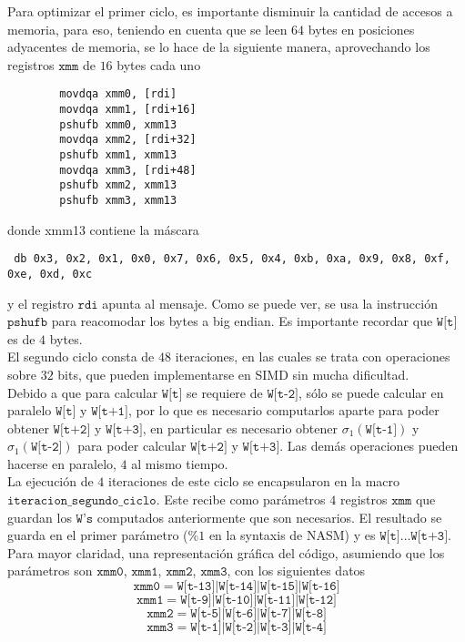Para optimizar el primer ciclo, es importante disminuir la cantidad de accesos a memoria, para eso, teniendo en cuenta que se leen $64$ bytes en posiciones adyacentes de memoria, se lo hace de la siguiente manera, aprovechando los registros $\texttt{xmm}$ de $16$ bytes cada uno
\begin{verbatim}
        movdqa xmm0, [rdi]
        movdqa xmm1, [rdi+16]
        pshufb xmm0, xmm13
        movdqa xmm2, [rdi+32]
        pshufb xmm1, xmm13
        movdqa xmm3, [rdi+48]
        pshufb xmm2, xmm13
        pshufb xmm3, xmm13
\end{verbatim}
donde xmm13 contiene la máscara
\begin{verbatim}
 db 0x3, 0x2, 0x1, 0x0, 0x7, 0x6, 0x5, 0x4, 0xb, 0xa, 0x9, 0x8, 0xf, 0xe, 0xd, 0xc
\end{verbatim}
y el registro $\texttt{rdi}$ apunta al mensaje. Como se puede ver, se usa la instrucción $\texttt{pshufb}$ para reacomodar los bytes a big endian. Es importante recordar que $\texttt{W[t]}$ es de $4$ bytes.\\
\indent El segundo ciclo consta de $48$ iteraciones, en las cuales se trata con operaciones sobre $32$ bits, que pueden implementarse en SIMD sin mucha dificultad.\\
\indent Debido a que para calcular $\texttt{W[t]}$ se requiere de $\texttt{W[t-2]}$, sólo se puede calcular en paralelo $\texttt{W[t]}$ y $\texttt{W[t+1]}$, por lo que es necesario computarlos aparte para poder obtener $\texttt{W[t+2]}$ y $\texttt{W[t+3]}$, en particular es necesario obtener $\sigma_1(\texttt{W[t-1]})$ y $\sigma_1(\texttt{W[t-2]})$ para poder calcular $\texttt{W[t+2]}$ y $\texttt{W[t+3]}$. Las demás operaciones pueden hacerse en paralelo, $4$ al mismo tiempo. \\
\indent La ejecución de $4$ iteraciones de este ciclo se encapsularon en la macro $\texttt{iteracion\_segundo\_ciclo}$. Este recibe como parámetros $4$ registros $\texttt{xmm}$ que guardan los $\texttt{W's}$ computados anteriormente que son necesarios. El resultado se guarda en el primer parámetro ($\%1$ en la syntaxis de NASM) y es $\texttt{W[t]} \dots \texttt{W[t+3]}$.\\
\indent Para mayor claridad, una representación gráfica del código, asumiendo que los parámetros son 
$\texttt{xmm0}$, $\texttt{xmm1}$, $\texttt{xmm2}$, $\texttt{xmm3}$, con los siguientes datos
$$\texttt{xmm0} = \texttt{W[t-13]} | \texttt{W[t-14]} | \texttt{W[t-15]} | \texttt{W[t-16]}$$
$$\texttt{xmm1} = \texttt{W[t-9]} | \texttt{W[t-10]} | \texttt{W[t-11]} | \texttt{W[t-12]}$$
$$\texttt{xmm2} = \texttt{W[t-5]} | \texttt{W[t-6]} | \texttt{W[t-7]} | \texttt{W[t-8]}$$
$$\texttt{xmm3} = \texttt{W[t-1]} | \texttt{W[t-2]} | \texttt{W[t-3]} | \texttt{W[t-4]}$$

